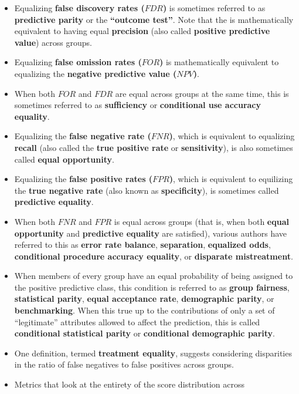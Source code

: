 \documentclass[]{krantz}
\begin{document}
\begin{itemize}
\item
  Equalizing \textbf{false discovery rates (\(FDR\))} is sometimes
  referred to as \textbf{predictive parity} or the \textbf{``outcome
  test''}. Note that the is mathematically equivalent to having equal
  \textbf{precision} (also called \textbf{positive predictive value})
  across groups.
\item
  Equalizing \textbf{false omission rates (\(FOR\))} is mathematically
  equivalent to equalizing the \textbf{negative predictive value
  (\(NPV\))}.
\item
  When both \(FOR\) and \(FDR\) are equal across groups at the same
  time, this is sometimes referred to as \textbf{sufficiency} or
  \textbf{conditional use accuracy equality}.
\item
  Equalizing the \textbf{false negative rate (\(FNR\))}, which is
  equivalent to equalizing \textbf{recall} (also called the \textbf{true
  positive rate} or \textbf{sensitivity}), is also sometimes called
  \textbf{equal opportunity}.
\item
  Equalizing the \textbf{false positive rates (\(FPR\))}, which is
  equivalent to equilizing the \textbf{true negative rate} (also known
  as \textbf{specificity}), is sometimes called \textbf{predictive
  equality}.
\item
  When both \(FNR\) and \(FPR\) is equal across groups (that is, when
  both \textbf{equal opportunity} and \textbf{predictive equality} are
  satisfied), various authors have referred to this as \textbf{error
  rate balance}, \textbf{separation}, \textbf{equalized odds},
  \textbf{conditional procedure accuracy equality}, or \textbf{disparate
  mistreatment}.
\item
  When members of every group have an equal probability of being
  assigned to the positive predictive class, this condition is referred
  to as \textbf{group fairness}, \textbf{statistical parity},
  \textbf{equal acceptance rate}, \textbf{demographic parity}, or
  \textbf{benchmarking}. When this true up to the contributions of only
  a set of ``legitimate'' attributes allowed to affect the prediction,
  this is called \textbf{conditional statistical parity} or
  \textbf{conditional demographic parity}.
\item
  One definition, termed \textbf{treatment equality}, suggests
  considering disparities in the ratio of false negatives to false
  positives across groups.
\item
  Metrics that look at the entirety of the score distribution across

\end{itemize}
\end{document}
